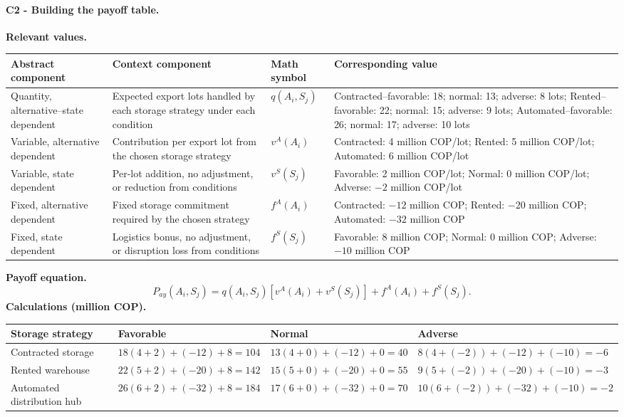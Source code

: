 	\paragraph*{C2 - Building the payoff table.}
	\label{subsec:problem6-coffee-export-storage-strategy-c2}
	\textbf{Relevant values.}
	\begin{center}
		\small
		\begin{tabularx}{\textwidth}{LLLL}
			\toprule
			Abstract component & Context component & Math symbol & Corresponding value \\
			\midrule
			Quantity, alternative--state dependent & Expected export lots handled by each storage strategy under each condition & $q(A_i,S_j)$ & Contracted--favorable: 18; normal: 13; adverse: 8 lots; Rented--favorable: 22; normal: 15; adverse: 9 lots; Automated--favorable: 26; normal: 17; adverse: 10 lots \\
			Variable, alternative dependent & Contribution per export lot from the chosen storage strategy & $v^A(A_i)$ & Contracted: 4 million COP/lot; Rented: 5 million COP/lot; Automated: 6 million COP/lot \\
			Variable, state dependent & Per-lot addition, no adjustment, or reduction from conditions & $v^S(S_j)$ & Favorable: 2 million COP/lot; Normal: 0 million COP/lot; Adverse: $-2$ million COP/lot \\
			Fixed, alternative dependent & Fixed storage commitment required by the chosen strategy & $f^A(A_i)$ & Contracted: $-12$ million COP; Rented: $-20$ million COP; Automated: $-32$ million COP \\
			Fixed, state dependent & Logistics bonus, no adjustment, or disruption loss from conditions & $f^S(S_j)$ & Favorable: 8 million COP; Normal: 0 million COP; Adverse: $-10$ million COP \\
			\bottomrule
		\end{tabularx}
	\end{center}
	\textbf{Payoff equation.}
	\[
		P_{ay}(A_i,S_j)
		=q(A_i,S_j)\left[v^A(A_i)+v^S(S_j)\right]+f^A(A_i)+f^S(S_j).
	\]
	\textbf{Calculations (million COP).}
	\begin{center}
		\small
		\begin{tabularx}{\textwidth}{L>{\centering\arraybackslash}X>{\centering\arraybackslash}X>{\centering\arraybackslash}X}
			\toprule
			Storage strategy & Favorable & Normal & Adverse \\
			\midrule
			Contracted storage & $18(4+2)+(-12)+8=104$ & $13(4+0)+(-12)+0=40$ & $8(4+(-2))+(-12)+(-10)=-6$ \\
			Rented warehouse & $22(5+2)+(-20)+8=142$ & $15(5+0)+(-20)+0=55$ & $9(5+(-2))+(-20)+(-10)=-3$ \\
			Automated distribution hub & $26(6+2)+(-32)+8=184$ & $17(6+0)+(-32)+0=70$ & $10(6+(-2))+(-32)+(-10)=-2$ \\
			\bottomrule
		\end{tabularx}
	\end{center}
